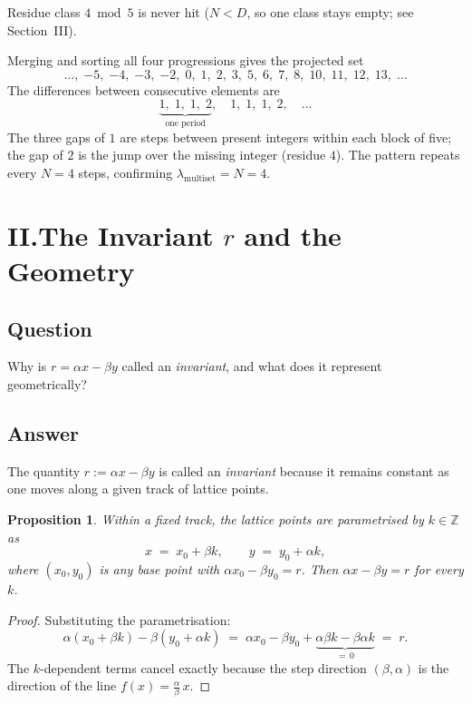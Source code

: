 \documentclass{amsart}
\theoremstyle{definition}
\theoremstyle{plain}
\newtheorem{prop}{Proposition}
\theoremstyle{remark}
\begin{document}
\noindent
Residue class \(4 \bmod 5\) is never hit (\(N < D\), so one class stays
empty; see Section~III).

Merging and sorting all four progressions gives the projected set
\[
  \ldots,\;{-5},\;{-4},\;{-3},\;{-2},\;0,\;1,\;2,\;3,\;5,\;6,\;7,\;8,\;
  10,\;11,\;12,\;13,\;\ldots
\]
The differences between consecutive elements are
\[
  \underbrace{1,\;1,\;1,\;2}_{\text{one period}},\quad
  1,\;1,\;1,\;2,\quad\ldots
\]
The three gaps of \(1\) are steps between present integers within each
block of five; the gap of \(2\) is the jump over the missing integer
(residue \(4\)).  The pattern repeats every \(N=4\) steps, confirming
\(\lambda_{\mathrm{multiset}} = N = 4\).

\section*{II.\enspace The Invariant \(r\) and the Geometry}

\subsection*{Question}

Why is \(r = \alpha x - \beta y\) called an \emph{invariant}, and what does
it represent geometrically?

\subsection*{Answer}

The quantity \(r := \alpha x - \beta y\) is called an \emph{invariant}
because it remains constant as one moves along a given track of lattice
points.

\begin{prop}
Within a fixed track, the lattice points are parametrised by \(k \in \mathbb{Z}\)
as
\[
  x \;=\; x_0 + \beta k, \qquad y \;=\; y_0 + \alpha k,
\]
where \((x_0, y_0)\) is any base point with \(\alpha x_0 - \beta y_0 = r\).
Then \(\alpha x - \beta y = r\) for every \(k\).
\end{prop}

\begin{proof}
Substituting the parametrisation:
\[
  \alpha(x_0 + \beta k) - \beta(y_0 + \alpha k)
  \;=\; \alpha x_0 - \beta y_0
      + \underbrace{\alpha \beta k - \beta \alpha k}_{=\, 0}
  \;=\; r.
\]
The \(k\)-dependent terms cancel exactly because the step direction
\((\beta, \alpha)\) is the direction of the line \(f(x) = \frac{\alpha}{\beta}\,x\).
\end{proof}
\end{document}
